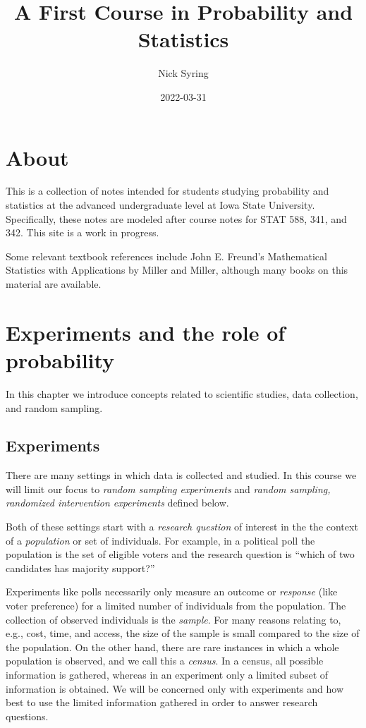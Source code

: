 \documentclass[
]{book}
\title{A First Course in Probability and Statistics}
\author{Nick Syring}
\date{2022-03-31}
\begin{document}
\maketitle

{
\setcounter{tocdepth}{1}
\tableofcontents
}
\hypertarget{about}{%
\chapter{About}\label{about}}

This is a collection of notes intended for students studying probability and statistics at the advanced undergraduate level at Iowa State University. Specifically, these notes are modeled after course notes for STAT 588, 341, and 342. This site is a work in progress.

Some relevant textbook references include John E. Freund's Mathematical Statistics with Applications by Miller and Miller, although many books on this material are available.

\hypertarget{experiments-and-the-role-of-probability}{%
\chapter{Experiments and the role of probability}\label{experiments-and-the-role-of-probability}}

In this chapter we introduce concepts related to scientific studies, data collection, and random sampling.

\hypertarget{experiments}{%
\section{Experiments}\label{experiments}}

There are many settings in which data is collected and studied. In this course we will limit our focus to \emph{random sampling experiments} and \emph{random sampling, randomized intervention experiments} defined below.

Both of these settings start with a \emph{research question} of interest in the the context of a \emph{population} or set of individuals. For example, in a political poll the population is the set of eligible voters and the research question is ``which of two candidates has majority support?''

Experiments like polls necessarily only measure an outcome or \emph{response} (like voter preference) for a limited number of individuals from the population. The collection of observed individuals is the \emph{sample}. For many reasons relating to, e.g., cost, time, and access, the size of the sample is small compared to the size of the population. On the other hand, there are rare instances in which a whole population is observed, and we call this a \emph{census}. In a census, all possible information is gathered, whereas in an experiment only a limited subset of information is obtained. We will be concerned only with experiments and how best to use the limited information gathered in order to answer research questions.
\end{document}
